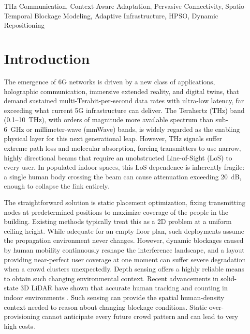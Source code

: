 \documentclass[conference]{IEEEtran}
\begin{document}
\begin{IEEEkeywords}
THz Communication, Context-Aware Adaptation, Pervasive Connectivity, Spatio-Temporal Blockage Modeling, Adaptive Infrastructure, HPSO, Dynamic Repositioning
\end{IEEEkeywords}

\section{Introduction}

The emergence of 6G networks is driven by a new class of applications, holographic communication, immersive extended reality, and digital twins, that demand sustained multi-Terabit-per-second data rates with ultra-low latency, far exceeding what current 5G infrastructure can deliver. The Terahertz (THz) band (0.1--10~THz), with orders of magnitude more available spectrum than sub-6~GHz or millimeter-wave (mmWave) bands, is widely regarded as the enabling physical layer for this next generational leap. However, THz signals suffer extreme path loss and molecular absorption, forcing transmitters to use narrow, highly directional beams that require an unobstructed Line-of-Sight (LoS) to every user. In populated indoor spaces, this LoS dependence is inherently fragile: a single human body crossing the beam can cause attenuation exceeding 20~dB, enough to collapse the link entirely.

The straightforward solution is static placement optimization, fixing transmitting nodes at predetermined positions to maximize coverage of the people in the building. Existing methods typically treat this as a 2D problem at a uniform ceiling height. While adequate for an empty floor plan, such deployments assume the propagation environment never changes. However, dynamic blockages caused by human mobility continuously reshape the interference landscape, and a layout providing near-perfect user coverage at one moment can suffer severe degradation when a crowd clusters unexpectedly. 
Depth sensing offers a highly reliable means to obtain such changing environmental context. Recent advancements in solid-state 3D LiDAR have shown that accurate human tracking and counting in indoor environments \cite{b27,b29}. Such sensing can provide the spatial human-density context needed to reason about changing blockage conditions. Static over-provisioning cannot anticipate every future crowd pattern and can lead to very high costs.
\end{document}
